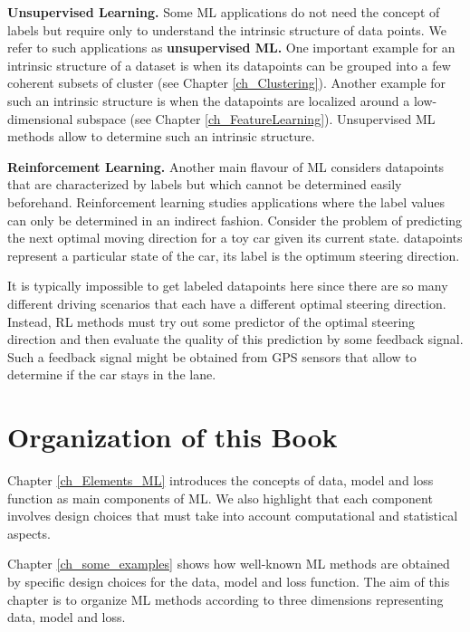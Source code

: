 \documentclass[12pt]{report}
\begin{document}
{\bf Unsupervised Learning.}
Some ML applications do not need the concept of labels 
but require only to understand the intrinsic structure of data 
points. We refer to such applications as {\bf unsupervised ML.} 
One important example for an intrinsic structure of a dataset is 
when its datapoints can be grouped into a few coherent subsets 
of cluster (see Chapter \ref{ch_Clustering}). Another example for 
such an intrinsic structure is when the datapoints are localized 
around a low-dimensional subspace (see Chapter \ref{ch_FeatureLearning}). 
Unsupervised ML methods allow to determine such an intrinsic structure. 

{\bf Reinforcement Learning.} 
Another main flavour of ML considers datapoints that are characterized 
by labels but which cannot be determined easily beforehand. Reinforcement 
learning studies applications where the label values can only be determined 
in an indirect fashion. Consider the problem of predicting the next optimal 
moving direction for a toy car given its current state. datapoints represent 
a particular state of the car, its label is the optimum steering direction. 

It is typically impossible to get labeled datapoints here since there 
are so many different driving scenarios that each have a different 
optimal steering direction. Instead, RL methods must try out 
some predictor of the optimal steering direction and then 
evaluate the quality of this prediction by some feedback signal. 
Such a feedback signal might be obtained from GPS sensors that 
allow to determine if the car stays in the lane. 

\section{Organization of this Book}

Chapter \ref{ch_Elements_ML} introduces the concepts of data, 
model and loss function as main components of ML. We also 
highlight that each component involves design choices that must 
take into account computational and statistical aspects. 

Chapter \ref{ch_some_examples} shows how well-known ML methods 
are obtained by specific design choices for the data, model
and loss function. The aim of this chapter is to organize ML methods 
according to three dimensions representing data, model and loss. 
\end{document}
